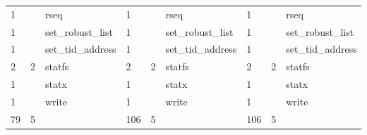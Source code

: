 \documentclass[submit,techreq,noauthor]{eco}	%
\begin{document}
\begin{table}[t]
\begin{tabular}{|lll|lll|lll|}
  \multicolumn{1}{|l|}{1}     & \multicolumn{1}{l|}{}       & rseq              & \multicolumn{1}{l|}{1}     & \multicolumn{1}{l|}{}       & rseq              & \multicolumn{1}{l|}{1}     & \multicolumn{1}{l|}{}       & rseq              \\
  \multicolumn{1}{|l|}{1}     & \multicolumn{1}{l|}{}       & set\_robust\_list & \multicolumn{1}{l|}{1}     & \multicolumn{1}{l|}{}       & set\_robust\_list & \multicolumn{1}{l|}{1}     & \multicolumn{1}{l|}{}       & set\_robust\_list \\
  \multicolumn{1}{|l|}{1}     & \multicolumn{1}{l|}{}       & set\_tid\_address & \multicolumn{1}{l|}{1}     & \multicolumn{1}{l|}{}       & set\_tid\_address & \multicolumn{1}{l|}{1}     & \multicolumn{1}{l|}{}       & set\_tid\_address \\
  \multicolumn{1}{|l|}{2}     & \multicolumn{1}{l|}{2}      & statfs            & \multicolumn{1}{l|}{2}     & \multicolumn{1}{l|}{2}      & statfs            & \multicolumn{1}{l|}{2}     & \multicolumn{1}{l|}{2}      & statfs            \\
  \multicolumn{1}{|l|}{1}     & \multicolumn{1}{l|}{}       & statx             & \multicolumn{1}{l|}{1}     & \multicolumn{1}{l|}{}       & statx             & \multicolumn{1}{l|}{1}     & \multicolumn{1}{l|}{}       & statx             \\
  \multicolumn{1}{|l|}{1}     & \multicolumn{1}{l|}{}       & write             & \multicolumn{1}{l|}{1}     & \multicolumn{1}{l|}{}       & write             & \multicolumn{1}{l|}{1}     & \multicolumn{1}{l|}{}       & write             \\ \hline
  \multicolumn{1}{|l|}{79}    & \multicolumn{1}{l|}{5}      &                   & \multicolumn{1}{l|}{106}   & \multicolumn{1}{l|}{5}      &                   & \multicolumn{1}{l|}{106}   & \multicolumn{1}{l|}{5}      &                   \\ \hline
  \end{tabular}
  \end{table}
\end{document}
